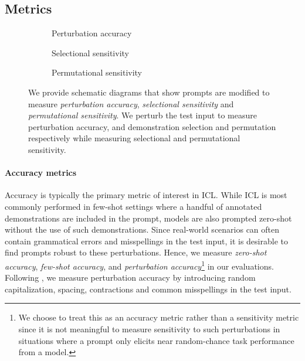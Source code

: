 \subsection{Metrics}
\begin{figure*}
  \begin{subfigure}[b]{0.32\textwidth}
    \centering
    \resizebox{\linewidth}{!}{
    
    }
    \caption{Perturbation accuracy}
  \end{subfigure}\hfill
  \begin{subfigure}[b]{0.32\textwidth}
    \centering
    \resizebox{\linewidth}{!}{
    
    }
    \caption{Selectional sensitivity}
  \end{subfigure}\hfill
  \begin{subfigure}[b]{0.32\textwidth}
    \centering
    \resizebox{\linewidth}{!}{
    
    }
    \caption{Permutational sensitivity}
  \end{subfigure}
  \caption{
        We provide schematic diagrams that show prompts are modified to measure \textit{perturbation accuracy}, \textit{selectional sensitivity} and \textit{permutational sensitivity}. We perturb the test input to measure perturbation accuracy, and demonstration selection and permutation respectively while measuring selectional and permutational sensitivity.
    }
    \label{fig:sensitivity-metrics}
\end{figure*}

\label{sec:metrics}
\paragraph{Accuracy metrics} Accuracy is typically the primary metric of interest in ICL. While ICL is most commonly performed in few-shot settings where a handful of annotated demonstrations are included in the prompt, models are also prompted zero-shot without the use of such demonstrations. Since real-world scenarios can often contain grammatical errors and misspellings in the test input, it is desirable to find prompts robust to these perturbations. Hence, we measure \textit{zero-shot accuracy}, \textit{few-shot accuracy}, and \textit{perturbation accuracy}\footnote{We choose to treat this as an accuracy metric rather than a sensitivity metric since it is not meaningful to measure sensitivity to such perturbations in situations where a prompt only elicits near random-chance task performance from a model.} in our evaluations. Following \citet{helm}, we measure perturbation accuracy by introducing random capitalization, spacing, contractions and common misspellings in the test input.


